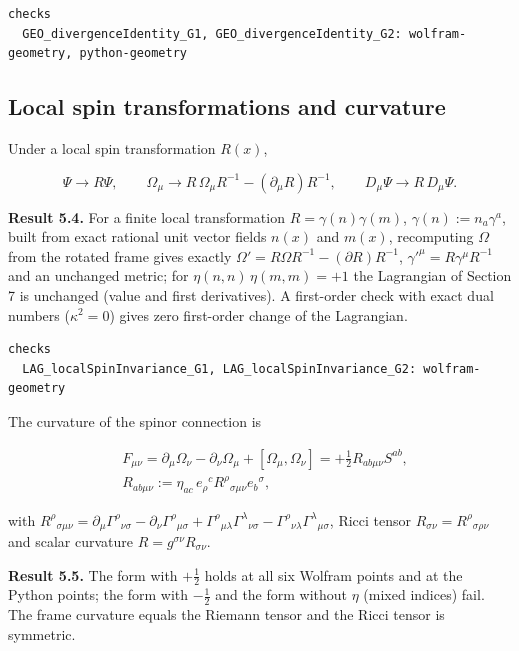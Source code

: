 \documentclass[11pt]{article}
\begin{document}
\begin{Verbatim}[fontsize=\small]
checks
  GEO_divergenceIdentity_G1, GEO_divergenceIdentity_G2: wolfram-geometry, python-geometry
\end{Verbatim}

\subsection{Local spin transformations and curvature}

Under a local spin transformation $R(x)$,

\[
\Psi\to R\Psi,\qquad \Omega_\mu\to R\,\Omega_\mu R^{-1}-(\partial_\mu R)R^{-1},\qquad D_\mu\Psi\to R\,D_\mu\Psi .
\]

\textbf{Result 5.4.} For a finite local transformation $R=\gamma(n)\gamma(m)$, $\gamma(n):=n_a\gamma^a$, built from exact rational unit vector fields $n(x)$ and $m(x)$, recomputing $\Omega$ from the rotated frame gives exactly $\Omega'=R\Omega R^{-1}-(\partial R)R^{-1}$, $\gamma'^\mu=R\gamma^\mu R^{-1}$ and an unchanged metric; for $\eta(n,n)\,\eta(m,m)=+1$ the Lagrangian of Section 7 is unchanged (value and first derivatives). A first-order check with exact dual numbers ($\kappa^2=0$) gives zero first-order change of the Lagrangian.

\begin{Verbatim}[fontsize=\small]
checks
  LAG_localSpinInvariance_G1, LAG_localSpinInvariance_G2: wolfram-geometry
\end{Verbatim}

The curvature of the spinor connection is

\[
\begin{aligned}
&F_{\mu\nu}=\partial_\mu\Omega_\nu-\partial_\nu\Omega_\mu+[\Omega_\mu,\Omega_\nu]=+\tfrac12R_{ab\mu\nu}S^{ab},\\
&R_{ab\mu\nu}:=\eta_{ac}\,e_\rho{}^c R^\rho{}_{\sigma\mu\nu}e_b{}^\sigma,
\end{aligned}
\]

with $R^\rho{}_{\sigma\mu\nu}=\partial_\mu\Gamma^\rho{}_{\nu\sigma}-\partial_\nu\Gamma^\rho{}_{\mu\sigma}+\Gamma^\rho{}_{\mu\lambda}\Gamma^\lambda{}_{\nu\sigma}-\Gamma^\rho{}_{\nu\lambda}\Gamma^\lambda{}_{\mu\sigma}$, Ricci tensor $R_{\sigma\nu}=R^\rho{}_{\sigma\rho\nu}$ and scalar curvature $R=g^{\sigma\nu}R_{\sigma\nu}$.

\textbf{Result 5.5.} The form with $+\tfrac12$ holds at all six Wolfram points and at the Python points; the form with $-\tfrac12$ and the form without $\eta$ (mixed indices) fail. The frame curvature equals the Riemann tensor and the Ricci tensor is symmetric.
\end{document}
